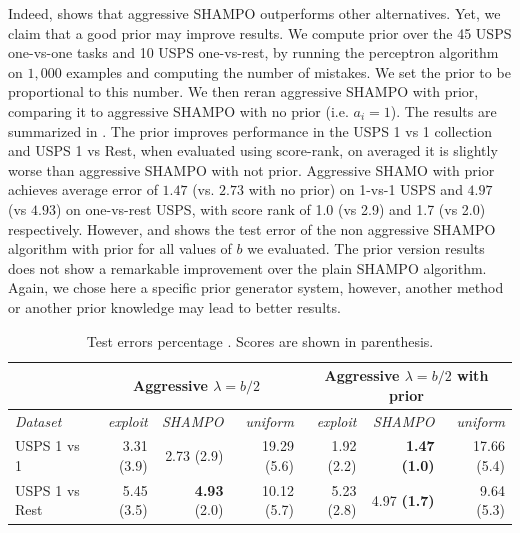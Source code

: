 Indeed,  shows that aggressive SHAMPO outperforms other alternatives. Yet, we claim that a 
good prior may improve results. We compute prior over the 45 USPS one-vs-one tasks and 10 
USPS one-vs-rest, by running the perceptron algorithm on $1,000$ examples and computing the number of mistakes.  
We set the prior to be proportional to this number. We then reran aggressive SHAMPO with prior, 
comparing it to aggressive SHAMPO with no prior (i.e. $a_i=1$). 
The results are summarized in . The prior improves performance in the USPS 1 vs 1 
collection and USPS 1 vs Rest, when evaluated using score-rank, on averaged it is slightly worse than 
aggressive SHAMPO with not prior.
Aggressive SHAMO with prior achieves average error of $1.47$ (vs. $2.73$ with no prior) on 1-vs-1 USPS 
and $4.97$ (vs $4.93$) on one-vs-rest USPS, with score rank of 1.0 (vs 2.9) and 1.7 (vs 2.0) respectively.
However,   and  shows the test error of the non aggressive SHAMPO 
algorithm with prior for all values of $b$ we evaluated. The prior version results does not show a remarkable 
improvement over the plain SHAMPO algorithm. Again, we chose here a specific prior generator system, 
however, another method or another prior knowledge may lead to better results.

 \begin{table}[h]
   \begin{centering}
 \caption{Test errors percentage . Scores are shown in parenthesis.}
 \label{tab:table2}
 {\scriptsize	
 \begin{tabular}{|l|r|r|r|r|r|r|}
 \hline
                         & \multicolumn{3}{c|}{\textbf{Aggressive $\lambda=b/2$}}           & \multicolumn{3}{c|}{\textbf{Aggressive $\lambda=b/2$ with prior}}  \\ \hline
 \textit{Dataset}        & \textit{exploit} & \textit{SHAMPO}     & \textit{uniform} & \textit{exploit} & \textit{SHAMPO}        & \textit{uniform} \\ \hline
 {USPS 1 vs 1}     & 3.31 (3.9)       & 2.73 (2.9)        & 19.29 (5.6)      & 1.92 (2.2)       & \textbf{1.47 (1.0)}    & 17.66 (5.4)      \\
 {USPS 1 vs Rest} & 5.45 (3.5)       & \textbf{4.93 }(2.0) & 10.12 (5.7)     & 5.23 (2.8)      & 4.97 \textbf{(1.7)} & 9.64 (5.3)      \\ \hline
 \end{tabular}
 }
 \end{centering}
 \end{table}
 
